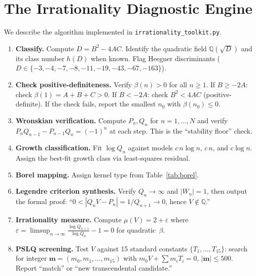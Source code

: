 \documentclass[11pt,a4paper]{article}
\theoremstyle{definition}
\theoremstyle{remark}
\begin{document}
\section{The Irrationality Diagnostic Engine}\label{sec:engine}

We describe the algorithm implemented in \texttt{irrationality\_toolkit.py}.

\begin{enumerate}[label=\textbf{Stage \arabic*.},leftmargin=3em]
  \item \textbf{Classify.}
    Compute $D = B^2 - 4AC$.  Identify the quadratic field
    $\mathbb{Q}(\sqrt{D})$ and its class number $h(D)$ when known.
    Flag Heegner discriminants ($D \in \{-3,-4,-7,-8,-11,-19,-43,-67,-163\}$).

  \item \textbf{Check positive-definiteness.}
    Verify $\beta(n) > 0$ for all $n \ge 1$.
    If $B \ge -2A$: check $\beta(1) = A+B+C > 0$.
    If $B < -2A$: check $B^2 < 4AC$ (positive-definite).
    If the check fails, report the smallest $n_0$ with $\beta(n_0) \le 0$.

  \item \textbf{Wronskian verification.}
    Compute $P_n, Q_n$ for $n = 1, \ldots, N$ and verify
    $P_n Q_{n-1} - P_{n-1} Q_n = (-1)^n$ at each step.
    This is the ``stability floor'' check.

  \item \textbf{Growth classification.}
    Fit $\log Q_n$ against models $c\,n\log n$, $c\,n$, and $c\log n$.
    Assign the best-fit growth class via least-squares residual.

  \item \textbf{Borel mapping.}
    Assign kernel type from Table~\ref{tab:borel}.

  \item \textbf{Legendre criterion synthesis.}
    Verify $Q_n \to \infty$ and $|W_n| = 1$, then output the formal
    proof: ``$0 < |Q_n V - P_n| = 1/Q_{n+1} \to 0$, hence $V \notin \mathbb{Q}$.''

  \item \textbf{Irrationality measure.}
    Compute $\mu(V) = 2 + \varepsilon$ where
    $\varepsilon = \limsup_{n \to \infty}
    \frac{\log Q_{n+1}}{\log Q_n} - 1 = 0$ for quadratic~$\beta$.

  \item \textbf{PSLQ screening.}
    Test $V$ against 15 standard constants $\{T_1, \ldots, T_{15}\}$:
    search for integer $\mathbf{m} = (m_0, m_1, \ldots, m_{15})$ with
    $m_0 V + \sum m_i T_i = 0$, $|\mathbf{m}| \le 500$.
    Report ``match'' or ``new transcendental candidate.''
\end{enumerate}
\end{document}

